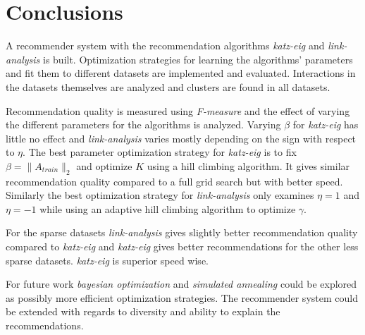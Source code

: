 \chapter{Conclusions}\label{cha:conclusions}

A recommender system with the recommendation algorithms \textit{katz-eig} and \textit{link-analysis} is built. Optimization strategies for learning the algorithms' parameters and fit them to different datasets are implemented and evaluated. Interactions in the datasets themselves are analyzed and clusters are found in all datasets.

Recommendation quality is measured using \textit{F-measure} and the effect of varying the different parameters for the algorithms is analyzed. Varying $\beta$ for \textit{katz-eig} has little no effect and \textit{link-analysis} varies mostly depending on the sign with respect to $\eta$. The best parameter optimization strategy for \textit{katz-eig} is to fix $\beta = \| A_{train}\|_2$ and optimize $K$ using a hill climbing algorithm. It gives similar recommendation quality compared to a full grid search but with better speed. Similarly the best optimization strategy for \textit{link-analysis} only examines $\eta = 1$ and $\eta = -1$ while using an adaptive hill climbing algorithm to optimize $\gamma$.


For the sparse datasets \textit{link-analysis} gives slightly better recommendation quality compared to \textit{katz-eig} and \textit{katz-eig} gives better recommendations for the other less sparse datasets. \textit{katz-eig} is superior speed wise.

For future work \textit{bayesian optimization} and \textit{simulated annealing} could be explored as possibly more efficient optimization strategies.  The recommender system could be extended with regards to diversity and ability to explain the recommendations.

